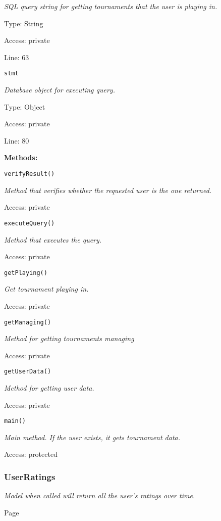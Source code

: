 {\scriptsize
\textit{SQL query string for getting tournaments that the user is playing in.}

Type: String

Access: private

Line: 63

}
\texttt{stmt}

{\scriptsize
\textit{Database object for executing query.}

Type: Object

Access: private

Line: 80

}
\textbf{Methods:}

\texttt{verifyResult()}

{\scriptsize
\textit{Method that verifies whether the requested user is the one returned.}

Access: private

}

\texttt{executeQuery()}

{\scriptsize
\textit{Method that executes the query.}

Access: private

}

\texttt{getPlaying()}

{\scriptsize
\textit{Get tournament playing in.}

Access: private

}

\texttt{getManaging()}

{\scriptsize
\textit{Method for getting tournaments managing}

Access: private

}

\texttt{getUserData()}

{\scriptsize
\textit{Method for getting user data.}

Access: private

}

\texttt{main()}

{\scriptsize
\textit{Main method.
If the user exists, it gets tournament data.}

Access: protected

}

\subsubsection{UserRatings}
\textit{Model when called will return all the user's ratings over time.}

Page \pageref{UserRatings.php}

